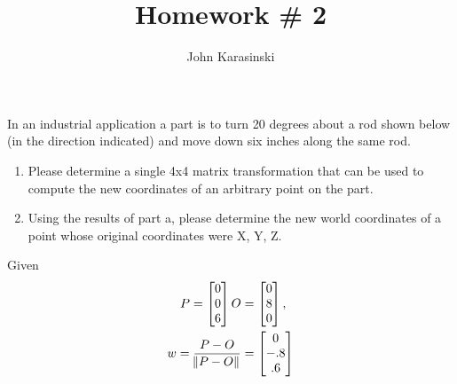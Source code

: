\documentclass[onecolumn,10pt]{jhwhw}
\author{John Karasinski}
\title{Homework \# 2}
\begin{document}

\problem{}
In an industrial application a part is to turn 20 degrees about a rod shown below (in the direction indicated) and move down six inches along the same rod.
\begin{enumerate}
    \item Please determine a single 4x4 matrix transformation that can be used to compute the new coordinates of an arbitrary point on the part.
    \item Using the results of part a, please determine the new world coordinates of a point whose original coordinates were X, Y, Z.
\end{enumerate}

Given
\begin{align*}
P =
\begin{bmatrix*}[c]
0 \\
0 \\
6
\end{bmatrix*}
O &=
\begin{bmatrix*}[c]
0 \\
8 \\
0
\end{bmatrix*},\\
w = \dfrac{P - O}{\norm{P - O}} &=
\begin{bmatrix*}[c]
0 \\
-.8 \\
.6
\end{bmatrix*}
\end{align*}
\end{document}
